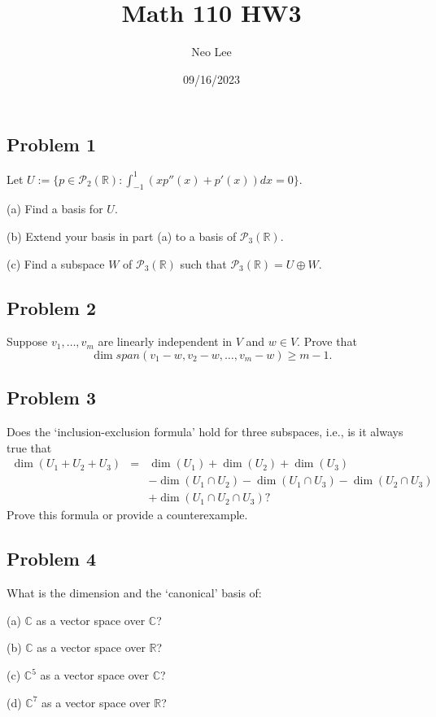 \documentclass{article}
\title{Math 110 HW3}
\author{Neo Lee}
\date{09/16/2023}
\begin{document}
 

\maketitle 

\subsection*{Problem 1}
Let $U:=\{p\in\mathcal{P}_2(\mathbb{R}):\int_{-1}^{1}(xp''(x)+p'(x))dx=0\}.$
\begin{description}
    \item{(a)} Find a basis for $U$. 
    \item{(b)} Extend your basis in part (a) to a basis of ${\mathcal P}_3(\mathbb{R})$.
    \item{(c)} Find a subspace $W$ of ${\mathcal P}_3(\mathbb{R})$ such that ${\mathcal P}_3(\mathbb{R}) = U \oplus W$.
\end{description}

\newpage
\subsection*{Problem 2}
Suppose $v_1, \ldots, v_m$ are linearly independent in $V$ and $w\in V$.  
Prove that $$ \dim span (v_1 - w, v_2 - w, \dots, v_m - w) \ge m-1.$$

\newpage
\subsection*{Problem 3}
Does the `inclusion-exclusion formula' hold for three subspaces, i.e., is it always true that
\begin{eqnarray*} \dim (U_1+U_2+U_3) &= & \dim (U_1)+\dim (U_2)+ \dim (U_3) \\
&&  - \dim (U_1 \cap U_2)- \dim (U_1 \cap U_3)- \dim (U_2 \cap U_3)\\ && + \dim (U_1\cap U_2 \cap U_3)?
\end{eqnarray*} Prove this formula or provide a counterexample.

\newpage
\subsection*{Problem 4}
What is the dimension and the `canonical' basis of:
\begin{description}
\item{(a)}  $\mathbb{C}$ as a vector space over $\mathbb{C}$?  
\item{(b)} $\mathbb{C}$ as a vector space over $\mathbb{R}$? 
\item{(c)} $\mathbb{C}^5$ as a vector space over $\mathbb{C}$?
\item{(d)} $\mathbb{C}^7$ as a vector space over $\mathbb{R}$?
\end{description}
\end{document}

